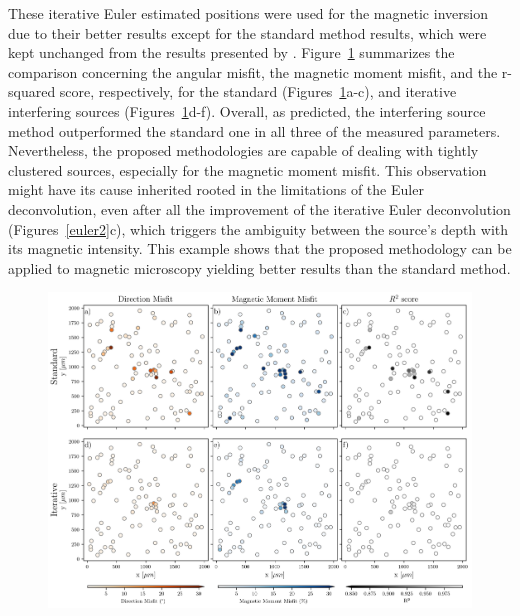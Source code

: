 These iterative Euler estimated positions were used for the magnetic inversion due to their better results except for the standard method results, which were kept unchanged from the results presented by \citet{Souza-Junior2023b}. Figure~\ref{inversion2} summarizes the comparison concerning the angular misfit, the magnetic moment misfit, and the r-squared score, respectively, for the standard (Figures~\ref{inversion2}a-c), and iterative interfering sources (Figures~\ref{inversion2}d-f). Overall, as predicted, the interfering source method outperformed the standard one in all three of the measured parameters. Nevertheless, the proposed methodologies are capable of dealing with tightly clustered sources, especially for the magnetic moment misfit. This observation might have its cause inherited rooted in the limitations of the Euler deconvolution, even after all the improvement of the iterative Euler deconvolution (Figures~\ref{euler2}c), which triggers the ambiguity between the source's depth with its magnetic intensity. This example shows that the proposed methodology can be applied to magnetic microscopy yielding better results than the standard method.


\begin{figure}[tb!]
  \centering
  \includegraphics[width=1\linewidth]{figures/inversion-comparion-2.png}
  \caption{
      }
  \label{inversion2}
\end{figure}

